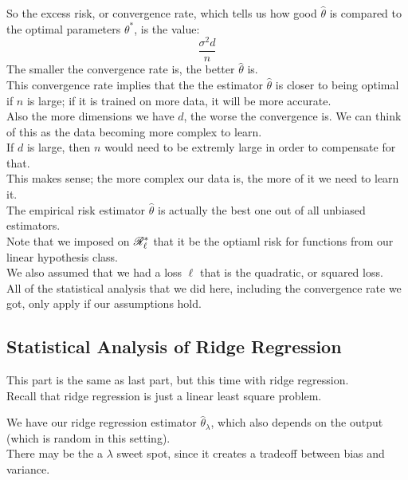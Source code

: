 \documentclass[12pt]{article}
\begin{document}
So the excess risk, or convergence rate,
which tells us how good $\hat{\theta}$
is compared to the optimal parameters $\theta^*$,
is the value:
\[ \dfrac{\sigma^2 d}{n} \]
The smaller the convergence rate is,
the better $\hat{\theta}$ is. \\

This convergence rate implies that the
the estimator $\hat{\theta}$
is closer to being optimal if $n$ is large;
if it is trained on more data, 
it will be more accurate. \\

Also the more dimensions we have $d$,
the worse the convergence is.
We can think of this as the data becoming
more complex to learn. \\
If $d$ is large, then $n$ would need to be extremly
large in order to compensate for that. \\
This makes sense; the more complex our data is,
the more of it we need to learn it. \\

The empirical risk estimator
$\hat{\theta}$ is actually the best
one out of all unbiased estimators. \\

Note that we imposed on $\mathscr{R}_{\ell}^*$
that it be the optiaml risk for functions
from our linear hypothesis class. \\
We also assumed that we had a loss $\ell$
that is the quadratic, or squared loss. \\
All of the statistical analysis that we did 
here, including the convergence rate we got,
only apply if our assumptions hold. \\

\newpage

\subsection*{Statistical Analysis of Ridge Regression}

This part is the same as last part, but this time
with ridge regression. \\

Recall that ridge regression is just
a linear least square problem.

We have our ridge regression estimator 
$\hat{\theta}_\lambda$,
which also depends on the output
(which is random in this setting). \\

There may be the a $\lambda$ sweet spot,
since it creates a tradeoff between bias
and variance. \\
\end{document}
